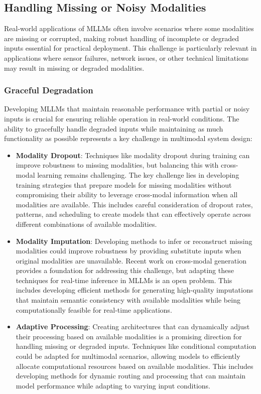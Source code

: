\subsection{Handling Missing or Noisy Modalities}
Real-world applications of MLLMs often involve scenarios where some modalities are missing or corrupted, making robust handling of incomplete or degraded inputs essential for practical deployment. This challenge is particularly relevant in applications where sensor failures, network issues, or other technical limitations may result in missing or degraded modalities.

\subsubsection{Graceful Degradation}
Developing MLLMs that maintain reasonable performance with partial or noisy inputs is crucial for ensuring reliable operation in real-world conditions. The ability to gracefully handle degraded inputs while maintaining as much functionality as possible represents a key challenge in multimodal system design:

\begin{itemize}
    \item \textbf{Modality Dropout}: Techniques like modality dropout \citep{chen2019uniter} during training can improve robustness to missing modalities, but balancing this with cross-modal learning remains challenging. The key challenge lies in developing training strategies that prepare models for missing modalities without compromising their ability to leverage cross-modal information when all modalities are available. This includes careful consideration of dropout rates, patterns, and scheduling to create models that can effectively operate across different combinations of available modalities.
    
    \item \textbf{Modality Imputation}: Developing methods to infer or reconstruct missing modalities could improve robustness by providing substitute inputs when original modalities are unavailable. Recent work on cross-modal generation \citep{ramesh2021zero} provides a foundation for addressing this challenge, but adapting these techniques for real-time inference in MLLMs is an open problem. This includes developing efficient methods for generating high-quality imputations that maintain semantic consistency with available modalities while being computationally feasible for real-time applications.
    
    \item \textbf{Adaptive Processing}: Creating architectures that can dynamically adjust their processing based on available modalities is a promising direction for handling missing or degraded inputs. Techniques like conditional computation \citep{bengio2013estimating} could be adapted for multimodal scenarios, allowing models to efficiently allocate computational resources based on available modalities. This includes developing methods for dynamic routing and processing that can maintain model performance while adapting to varying input conditions.
\end{itemize}

